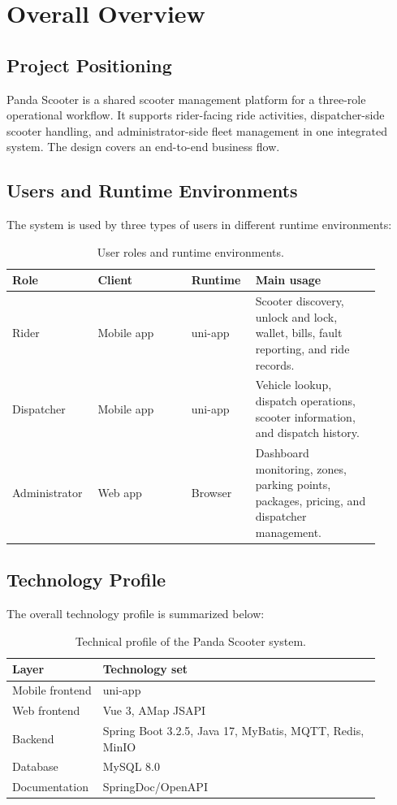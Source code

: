 \documentclass[12pt,a4paper]{article}
\begin{document}
\section{Overall Overview}

\subsection{Project Positioning}

Panda Scooter is a shared scooter management platform for a three-role operational workflow. It supports rider-facing ride activities, dispatcher-side scooter handling, and administrator-side fleet management in one integrated system. The design covers an end-to-end business flow.

\subsection{Users and Runtime Environments}

The system is used by three types of users in different runtime environments:

\begin{table}[H]
\centering
\begin{tabular}{p{0.18\linewidth} p{0.24\linewidth} p{0.16\linewidth} p{0.32\linewidth}}
\toprule
\textbf{Role} & \textbf{Client} & \textbf{Runtime} & \textbf{Main usage} \\
\midrule
Rider & Mobile app & uni-app & Scooter discovery, unlock and lock, wallet, bills, fault reporting, and ride records. \\
Dispatcher & Mobile app & uni-app & Vehicle lookup, dispatch operations, scooter information, and dispatch history. \\
Administrator & Web app & Browser & Dashboard monitoring, zones, parking points, packages, pricing, and dispatcher management. \\
\bottomrule
\end{tabular}
\caption{User roles and runtime environments.}
\end{table}

\subsection{Technology Profile}

The overall technology profile is summarized below:

\begin{table}[H]
\centering
\begin{tabular}{p{0.18\linewidth} p{0.72\linewidth}}
\toprule
\textbf{Layer} & \textbf{Technology set} \\
\midrule
Mobile frontend & uni-app \\
Web frontend & Vue 3, AMap JSAPI \\
Backend & Spring Boot 3.2.5, Java 17, MyBatis, MQTT, Redis, MinIO \\
Database & MySQL 8.0 \\
Documentation & SpringDoc/OpenAPI \\
\bottomrule
\end{tabular}
\caption{Technical profile of the Panda Scooter system.}
\end{table}
\end{document}
